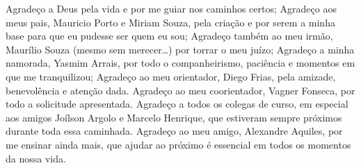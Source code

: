 Agradeço a Deus pela vida e por me guiar nos caminhos certos; Agradeço aos meus pais, Mauricio Porto e Miriam Souza, pela criação e por serem a minha base para que eu pudesse ser quem eu sou; Agradeço também ao meu irmão, Maurílio Souza (mesmo sem merecer\ldots) por torrar o meu juízo; Agradeço a minha namorada, Yasmim Arrais, por todo o companheirismo, paciência e momentos em que me tranquilizou; Agradeço ao meu orientador, Diego Frias, pela amizade, benevolência e atenção dada. Agradeço ao meu coorientador, Vagner Fonseca, por todo a solicitude apresentada. Agradeço a todos os colegas de curso, em especial aos amigos Joílson Argolo e Marcelo Henrique, que estiveram sempre próximos durante toda essa caminhada. Agradeço ao meu amigo, Alexandre Aquiles, por me ensinar ainda mais, que ajudar ao próximo é essencial em todos os momentos da nossa vida.